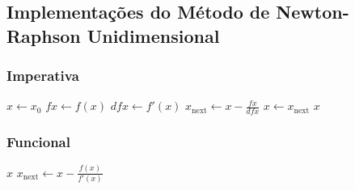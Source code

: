 \subsection{Implementações do Método de Newton-Raphson Unidimensional}

\subsubsection{Imperativa}

\begin{algorithm}[H]
    \caption{Newton-Raphson Iterativo}
    \label{alg:newton_imperativo}
    \begin{algorithmic}[1]
            \State $x \gets x_0$ 
                \State $fx \gets f(x)$
                \State $dfx \gets f'(x)$
                \State $x_{\text{next}} \gets x - \frac{fx}{dfx}$
                \State $x \gets x_{\text{next}}$ 
            \EndFor
            \State \Return $x$
        \EndProcedure
    \end{algorithmic}
\end{algorithm}

\subsubsection{Funcional}

\begin{algorithm}[H]
    \caption{Newton-Raphson Recursivo}
    \label{alg:newton_funcional}
    \begin{algorithmic}[1]
            
             
                    \State \Return $x$ 
                \Else
                    \State $x_{\text{next}} \gets x - \frac{f(x)}{f'(x)}$
                    \State \Return {} 
                \EndIf
            \EndFunction

            \State \Return {} 
        \EndProcedure
    \end{algorithmic}
\end{algorithm}

